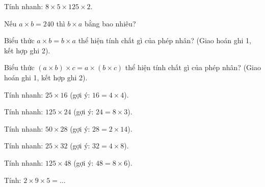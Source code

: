 \begin{ex}
Tính nhanh: $8 \times 5 \times 125 \times 2$.
\end{ex}

\begin{ex}
Nếu $a \times b = 240$ thì $b \times a$ bằng bao nhiêu?
\end{ex}

\begin{ex}
Biểu thức $a \times b = b \times a$ thể hiện tính chất gì của phép nhân? (Giao hoán ghi 1, kết hợp ghi 2).
\end{ex}

\begin{ex}
Biểu thức $(a \times b) \times c = a \times (b \times c)$ thể hiện tính chất gì của phép nhân? (Giao hoán ghi 1, kết hợp ghi 2).
\end{ex}

\begin{ex}
Tính nhanh: $25 \times 16$ (gợi ý: $16 = 4 \times 4$).
\end{ex}

\begin{ex}
Tính nhanh: $125 \times 24$ (gợi ý: $24 = 8 \times 3$).
\end{ex}

\begin{ex}
Tính nhanh: $50 \times 28$ (gợi ý: $28 = 2 \times 14$).
\end{ex}

\begin{ex}
Tính nhanh: $25 \times 32$ (gợi ý: $32 = 4 \times 8$).
\end{ex}

\begin{ex}
Tính nhanh: $125 \times 48$ (gợi ý: $48 = 8 \times 6$).
\end{ex}

\begin{ex}
Tính: $2 \times 9 \times 5 = \dots$
\end{ex}

